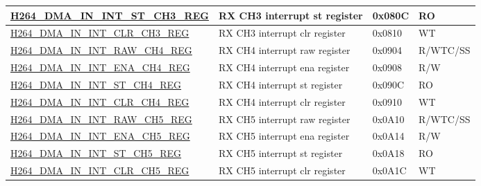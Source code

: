 \begin{longtable}{ | p{7.5cm} | p{5.7cm} | p{1.2cm} | p{1cm} | }
    \hyperref[regdesc:H264DMAININTSTCH3REG]{H264\_DMA\_IN\_INT\_ST\_CH3\_REG} & RX CH3  interrupt st register & 0x080C & RO \\ \hline
    \hyperref[regdesc:H264DMAININTCLRCH3REG]{H264\_DMA\_IN\_INT\_CLR\_CH3\_REG} & RX CH3  interrupt clr register & 0x0810 & WT \\ \hline
    \hyperref[regdesc:H264DMAININTRAWCH4REG]{H264\_DMA\_IN\_INT\_RAW\_CH4\_REG} & RX CH4  interrupt raw register & 0x0904 & R/WTC/SS \\ \hline
    \hyperref[regdesc:H264DMAININTENACH4REG]{H264\_DMA\_IN\_INT\_ENA\_CH4\_REG} & RX CH4  interrupt ena register & 0x0908 & R/W \\ \hline
    \hyperref[regdesc:H264DMAININTSTCH4REG]{H264\_DMA\_IN\_INT\_ST\_CH4\_REG} & RX CH4  interrupt st register & 0x090C & RO \\ \hline
    \hyperref[regdesc:H264DMAININTCLRCH4REG]{H264\_DMA\_IN\_INT\_CLR\_CH4\_REG} & RX CH4  interrupt clr register & 0x0910 & WT \\ \hline
    \hyperref[regdesc:H264DMAININTRAWCH5REG]{H264\_DMA\_IN\_INT\_RAW\_CH5\_REG} & RX CH5  interrupt raw register & 0x0A10 & R/WTC/SS \\ \hline
    \hyperref[regdesc:H264DMAININTENACH5REG]{H264\_DMA\_IN\_INT\_ENA\_CH5\_REG} & RX CH5  interrupt ena register & 0x0A14 & R/W \\ \hline
    \hyperref[regdesc:H264DMAININTSTCH5REG]{H264\_DMA\_IN\_INT\_ST\_CH5\_REG} & RX CH5  interrupt st register & 0x0A18 & RO \\ \hline
    \hyperref[regdesc:H264DMAININTCLRCH5REG]{H264\_DMA\_IN\_INT\_CLR\_CH5\_REG} & RX CH5  interrupt clr register & 0x0A1C & WT \\ \hline
    

\end{longtable}
